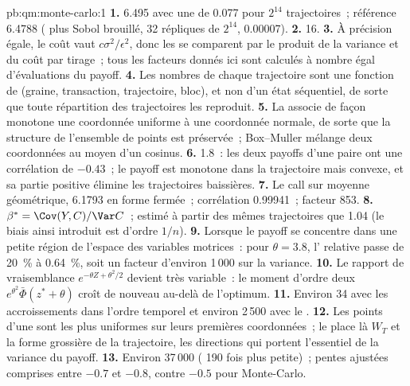 \begin{solution}{pb:qm:monte-carlo:1}
\textbf{1.} 6.495 avec une  de 0.077 pour $2^{14}$ trajectoires~; référence 6.4788 ( plus Sobol brouillé, 32 répliques de $2^{14}$,  0.00007).
\textbf{2.} 16.
\textbf{3.} À précision égale, le coût vaut $c\sigma^2/\epsilon^2$, donc les  se comparent par le produit de la variance et du coût par tirage~; tous les facteurs donnés ici sont calculés à nombre égal d'évaluations du payoff.
\textbf{4.} Les nombres de chaque trajectoire sont une fonction de (graine, transaction, trajectoire, bloc), et non d'un état séquentiel, de sorte que toute répartition des trajectoires les reproduit.
\textbf{5.} La  associe de façon monotone une coordonnée uniforme à une coordonnée normale, de sorte que la structure de l'ensemble de points est préservée~; Box--Muller mélange deux coordonnées au moyen d'un cosinus.
\textbf{6.} 1.8~: les deux payoffs d'une paire ont une corrélation de $-0.43$~; le payoff est monotone dans la trajectoire mais convexe, et sa partie positive élimine les trajectoires baissières.
\textbf{7.} Le call sur moyenne géométrique, 6.1793 en forme fermée~; corrélation 0.99941~; facteur 853.
\textbf{8.} $\beta^* = \Cov(Y, C)/\Var C$~; estimé à partir des mêmes trajectoires que 1.04 (le biais ainsi introduit est d'ordre $1/n$).
\textbf{9.} Lorsque le payoff se concentre dans une petite région de l'espace des variables motrices~: pour $\theta = 3.8$, l' relative passe de 20~\% à 0.64~\%, soit un facteur d'environ 1\,000 sur la variance.
\textbf{10.} Le rapport de vraisemblance $e^{-\theta Z + \theta^2/2}$ devient très variable~: le moment d'ordre deux $e^{\theta^2}\bar\Phi(z^* + \theta)$ croît de nouveau au-delà de l'optimum.
\textbf{11.} Environ 34 avec les accroissements dans l'ordre temporel et environ 2\,500 avec le .
\textbf{12.} Les points d'une  sont les plus uniformes sur leurs premières coordonnées~; le  place là $W_T$ et la forme grossière de la trajectoire, les directions qui portent l'essentiel de la variance du payoff.
\textbf{13.} Environ 37\,000 ( 190 fois plus petite)~; pentes ajustées comprises entre $-0.7$ et $-0.8$, contre $-0.5$ pour Monte-Carlo.

\end{solution}
